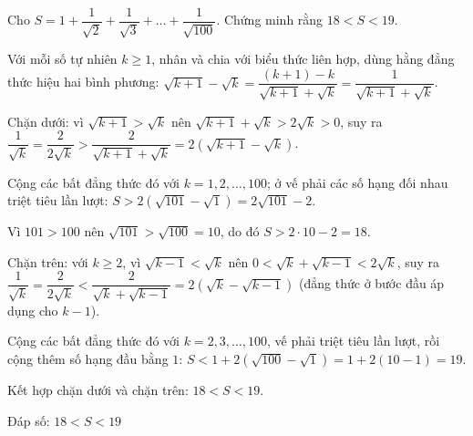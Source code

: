 \begin{problem}[9DS-CAN-030]
Cho $S = 1 + \dfrac{1}{\sqrt{2}} + \dfrac{1}{\sqrt{3}} + \dots + \dfrac{1}{\sqrt{100}}$. Chứng minh rằng $18 < S < 19$.

\begin{solution}
Với mỗi số tự nhiên $k \geq 1$, nhân và chia với biểu thức liên hợp, dùng hằng đẳng thức hiệu hai bình phương: $\sqrt{k + 1} - \sqrt{k} = \dfrac{(k + 1) - k}{\sqrt{k + 1} + \sqrt{k}} = \dfrac{1}{\sqrt{k + 1} + \sqrt{k}}$.

Chặn dưới: vì $\sqrt{k + 1} > \sqrt{k}$ nên $\sqrt{k + 1} + \sqrt{k} > 2\sqrt{k} > 0$, suy ra $\dfrac{1}{\sqrt{k}} = \dfrac{2}{2\sqrt{k}} > \dfrac{2}{\sqrt{k + 1} + \sqrt{k}} = 2(\sqrt{k + 1} - \sqrt{k})$.

Cộng các bất đẳng thức đó với $k = 1, 2, \dots, 100$; ở vế phải các số hạng đối nhau triệt tiêu lần lượt: $S > 2(\sqrt{101} - \sqrt{1}) = 2\sqrt{101} - 2$.

Vì $101 > 100$ nên $\sqrt{101} > \sqrt{100} = 10$, do đó $S > 2 \cdot 10 - 2 = 18$.

Chặn trên: với $k \geq 2$, vì $\sqrt{k - 1} < \sqrt{k}$ nên $0 < \sqrt{k} + \sqrt{k - 1} < 2\sqrt{k}$, suy ra $\dfrac{1}{\sqrt{k}} = \dfrac{2}{2\sqrt{k}} < \dfrac{2}{\sqrt{k} + \sqrt{k - 1}} = 2(\sqrt{k} - \sqrt{k - 1})$ (đẳng thức ở bước đầu áp dụng cho $k - 1$).

Cộng các bất đẳng thức đó với $k = 2, 3, \dots, 100$, vế phải triệt tiêu lần lượt, rồi cộng thêm số hạng đầu bằng $1$: $S < 1 + 2(\sqrt{100} - \sqrt{1}) = 1 + 2(10 - 1) = 19$.

Kết hợp chặn dưới và chặn trên: $18 < S < 19$.

Đáp số: $\boxed{18 < S < 19}$
\end{solution}
\end{problem}

